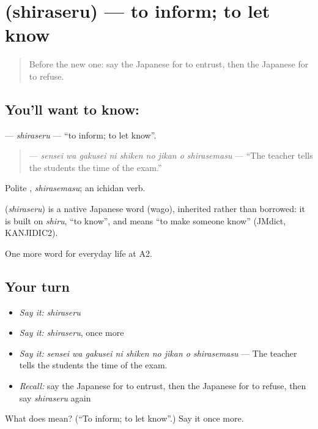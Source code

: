 \section[\texorpdfstring{\ja{しらせる} (shiraseru)}{しらせる (shiraseru)}]{ (shiraseru) — to inform; to let know}

\label{lesson:JA-C232-shiraseru}



\begin{quote}
Before the new one: say the Japanese for to entrust, then the Japanese for to refuse.
\end{quote}

\subsection*{You'll want to know: }
\textbf{} — \emph{shiraseru} — \textquotedblleft{}to inform; to let know\textquotedblright{}.

\begin{quote}
\textbf{    } — \emph{sensei wa gakusei ni shiken no jikan o shirasemasu} — \textquotedblleft{}The teacher tells the students the time of the exam.\textquotedblright{}
\end{quote}

Polite \textbf{}, \emph{shirasemasu}; an ichidan verb.

\begin{cousinweb}
\textbf{} (\emph{shiraseru}) is a native Japanese word (wago), inherited rather than borrowed: it is built on \emph{shiru}, \textquotedblleft{}to know\textquotedblright{}, and means \textquotedblleft{}to make someone know\textquotedblright{} (JMdict, KANJIDIC2).
\end{cousinweb}

\begin{grammarlens}[title={What you've built}]
One more word for everyday life at A2.
\end{grammarlens}

\subsection*{Your turn}
\begin{itemize}
\raggedright
  \item \emph{Say it:} \emph{shiraseru}
  \item \emph{Say it:} \emph{shiraseru}, once more
  \item \emph{Say it:} \emph{sensei wa gakusei ni shiken no jikan o shirasemasu} — The teacher tells the students the time of the exam.
  \item \emph{Recall:} say the Japanese for to entrust, then the Japanese for to refuse, then say \emph{shiraseru} again
\end{itemize}

\begin{tcolorbox}[breakable,colback=teal!4,colframe=teal!35!black,title={Before you move on}]
What does  mean? (\textquotedblleft{}To inform; to let know\textquotedblright{}.) Say it once more.
\end{tcolorbox}
